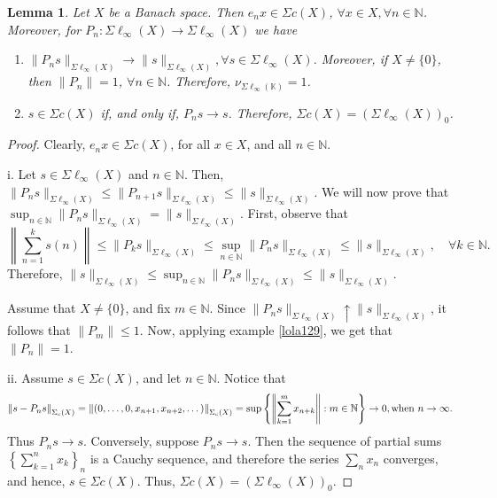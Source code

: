 \documentclass[14pt, a4paper]{article}  %
\providecommand{\llave}[1]{\left\lbrace #1\right\rbrace }
\providecommand{\pare}[1]{\left( #1\right) }
\providecommand{\norm}[1]{\left\lVert#1\right\rVert}
\providecommand{\Sum}[1]{\displaystyle\sum#1}
\newcommand{\tien}{\rightarrow}
\newcommand{\N}{\mathbb{N}}
\newtheorem{lemma}{Lemma}[section]
\begin{document}
	\begin{lemma}\label{d269}
		Let $X$ be a Banach space. Then $e_n x \in \Sigma c(X)$, $\forall x \in X, \forall n \in \mathbb{N}$. Moreover, for  $P_n: \Sigma \ell_{\infty}(X) \to \Sigma \ell_{\infty}(X)$ we have
		\begin{enumerate}  
			\item[i.]   $\|P_n s\|_{\Sigma \ell_{\infty}(X)} \tien \|s\|_{\Sigma \ell_{\infty}(X)},  \forall s \in \Sigma \ell_{\infty}(X)$. Moreover, if $X \neq \{0\}$, then $\|P_n\| = 1$, $\forall n \in \mathbb{N}$. Therefore, $\nu_{\Sigma \ell_{\infty}(\mathbb{K})} = 1$.
			\item[ii.]  $s \in \Sigma c(X)$ if, and only if, $P_n s \to s$. Therefore, $\Sigma c(X) = (\Sigma \ell_{\infty}(X))_0$.
		\end{enumerate}
	\end{lemma}
	\begin{proof}
		Clearly, $e_n x \in \Sigma c(X)$, for all $x \in X$, and all $n \in \mathbb{N}$.
		
		i. Let $s \in \Sigma \ell_{\infty}(X)$ and $n \in \mathbb{N}$. Then, $\|P_n s\|_{\Sigma \ell_{\infty}(X)} \leq \|P_{n+1} s\|_{\Sigma \ell_{\infty}(X)} \leq \|s\|_{\Sigma \ell_{\infty}(X)}.$  
		We will now prove that $\sup_{n \in \mathbb{N}} \|P_n s\|_{\Sigma \ell_{\infty}(X)} = \|s\|_{\Sigma \ell_{\infty}(X)}$. First, observe that \begin{equation}
			\norm{\sum_{n=1}^{k} s(n)} \leq \|P_k s\|_{\Sigma \ell_{\infty}(X)} \leq \sup_{n \in \mathbb{N}} \|P_n s\|_{\Sigma \ell_{\infty}(X)} \leq \|s\|_{\Sigma \ell_{\infty}(X)}, \quad \forall k \in \mathbb{N}.
		\end{equation}
		Therefore, $\|s\|_{\Sigma \ell_{\infty}(X)} \leq \sup_{n \in \mathbb{N}} \|P_n s\|_{\Sigma \ell_{\infty}(X)} \leq \|s\|_{\Sigma \ell_{\infty}(X)}$. 
		
		Assume that $X \neq \{0\}$, and fix $m \in \mathbb{N}$. Since $\|P_n s\|_{\Sigma \ell_{\infty}(X)} \uparrow \|s\|_{\Sigma \ell_{\infty}(X)}$, it follows that $\|P_m\| \leq 1$. Now, applying example \ref{lola129}, we get that $\|P_n\| = 1$.
		
		ii. Assume $s \in \Sigma c(X)$, and let $n \in \mathbb{N}$. Notice that $$\norm{s - P_n s}_{\Sigma_{c}\pare{X}} = \norm{(0, \dots, 0, x_{n+1}, x_{n+2}, \dots)}_{\Sigma_{c}\pare{X}}=\sup\llave{\norm{\Sum_{k=1}^{m}x_{n+k}}:m\in \N}\tien 0,\text{when } n\tien \infty.$$ Thus $P_n s \to s$. Conversely, suppose $P_n s \to s$. Then the sequence of partial sums $\llave{\sum_{k=1}^{n}x_{k}}_{n}$ is a Cauchy sequence, and therefore the series $\sum_n x_n$ converges, and hence, $s \in \Sigma c(X)$. Thus, $\Sigma c(X) = (\Sigma \ell_{\infty}(X))_0$.
	\end{proof}
	
\end{document}
